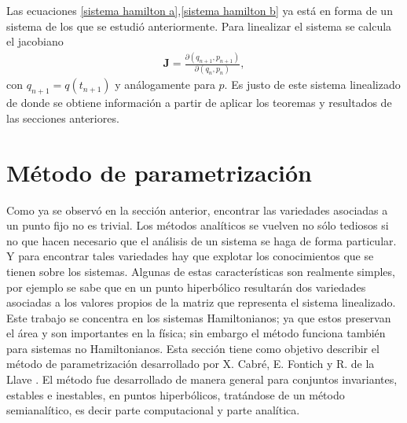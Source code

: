 Las ecuaciones \eqref{sistema hamilton a},\eqref{sistema hamilton b} ya está en forma de un sistema de los que se estudió anteriormente. Para linealizar el sistema se calcula el jacobiano
\begin{eqnarray}
\mathbf{J}=\frac{\partial(q_{n+1},p_{n+1})}{\partial(q_{n},p_{n})},
\end{eqnarray}
con $q_{n+1}=q(t_{n+1})$ y análogamente para $p$. Es justo de este sistema linealizado de donde se obtiene información a partir de aplicar los teoremas y resultados de las secciones anteriores. 










\section{Método de parametrización}
Como ya se observó en la sección anterior, encontrar las variedades asociadas a un punto fijo no es trivial. Los métodos analíticos se vuelven no sólo tediosos si no que hacen necesario que el análisis de un sistema se haga de forma particular. Y para encontrar tales variedades hay que explotar los conocimientos que se tienen sobre los sistemas. Algunas de estas características son realmente simples, por ejemplo se sabe que en un punto hiperbólico resultarán dos variedades asociadas a los valores propios de la matriz que representa el sistema linealizado. Este trabajo se concentra en los sistemas Hamiltonianos; ya que estos preservan el área y son importantes en la física; sin embargo el método funciona también para sistemas no Hamiltonianos. Esta sección tiene como objetivo describir el método de parametrización desarrollado por X. Cabré, E. Fontich y R. de la Llave \cite{Haro}. El método fue desarrollado de manera general para conjuntos invariantes, estables e inestables, en puntos hiperbólicos, tratándose de un método semianalítico, es decir parte computacional y parte analítica.\\



